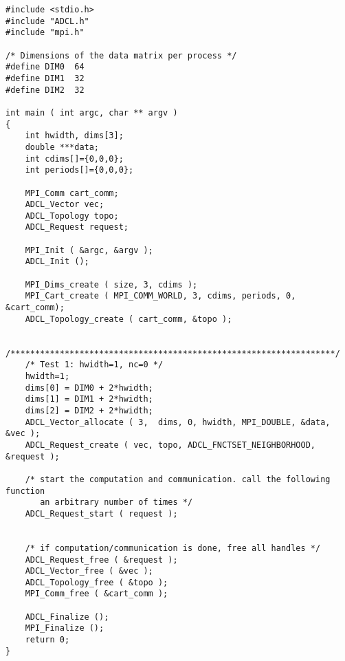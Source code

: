 \begin{verbatim}
#include <stdio.h>
#include "ADCL.h"
#include "mpi.h"

/* Dimensions of the data matrix per process */
#define DIM0  64
#define DIM1  32
#define DIM2  32

int main ( int argc, char ** argv ) 
{
    int hwidth, dims[3];
    double ***data;
    int cdims[]={0,0,0};
    int periods[]={0,0,0};
    
    MPI_Comm cart_comm;
    ADCL_Vector vec;
    ADCL_Topology topo;
    ADCL_Request request;

    MPI_Init ( &argc, &argv );
    ADCL_Init ();
    
    MPI_Dims_create ( size, 3, cdims );
    MPI_Cart_create ( MPI_COMM_WORLD, 3, cdims, periods, 0, &cart_comm);
    ADCL_Topology_create ( cart_comm, &topo );

    /******************************************************************/
    /* Test 1: hwidth=1, nc=0 */
    hwidth=1;
    dims[0] = DIM0 + 2*hwidth;
    dims[1] = DIM1 + 2*hwidth;
    dims[2] = DIM2 + 2*hwidth;
    ADCL_Vector_allocate ( 3,  dims, 0, hwidth, MPI_DOUBLE, &data, &vec );
    ADCL_Request_create ( vec, topo, ADCL_FNCTSET_NEIGHBORHOOD, &request );
    
    /* start the computation and communication. call the following function
       an arbitrary number of times */ 
    ADCL_Request_start ( request );


    /* if computation/communication is done, free all handles */
    ADCL_Request_free ( &request );
    ADCL_Vector_free ( &vec );
    ADCL_Topology_free ( &topo );
    MPI_Comm_free ( &cart_comm );
    
    ADCL_Finalize ();
    MPI_Finalize ();
    return 0;
}
\end{verbatim}